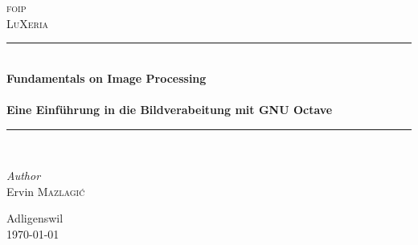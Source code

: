 \begin{titlepage}

\begin{center}

\textsc{\LARGE foip}\\[1.5cm]

\textsc{\Large LuXeria}\\[0.5cm]

\vfill{}

\newcommand{\HRule}{\rule{\linewidth}{0.5mm}}
\HRule \\[0.4cm]
{   \Huge \bfseries Fundamentals on Image Processing\\
        ~\\
        \large Eine Einführung in die Bildverabeitung mit GNU Octave}\\[0.4cm]

\HRule \\[1.5cm]

\begin{minipage}{0.4\textwidth}
    \begin{flushleft} \large
        \emph{Author}\\
        Ervin \textsc{Mazlagi\'c}\\
    \end{flushleft}
\end{minipage}
\hfill
\begin{minipage}{0.4\textwidth}
    \begin{flushright} \large
    \end{flushright}
\end{minipage}

\vfill{}
\vfill{}
\vfill{}

{\large Adligenswil\\ \today}

\end{center}

\end{titlepage}
